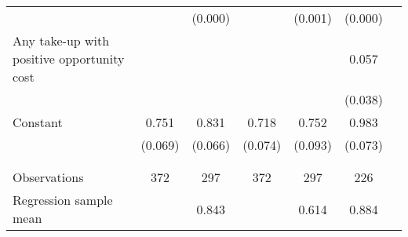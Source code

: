 \begin{tabular}{l*{6}{c}}
                    &                     &     (0.000)         &                     &     (0.001)         &     (0.000)         \\
[1em]
Any take-up with positive opportunity cost&                     &                     &                     &                     &       0.057         \\
                    &                     &                     &                     &                     &     (0.038)         \\
[1em]
Constant            &       0.751\sym{***}&       0.831\sym{***}&       0.718\sym{***}&       0.752\sym{***}&       0.983\sym{***}\\
                    &     (0.069)         &     (0.066)         &     (0.074)         &     (0.093)         &     (0.073)         \\
 \\[-1.8ex] \hline  \\[-1.8ex]
Observations        &         372         &         297         &         372         &         297         &         226         \\
Regression sample mean&                     &       0.843         &                     &       0.614         &       0.884         \\
\hline\hline \end{tabular} 
